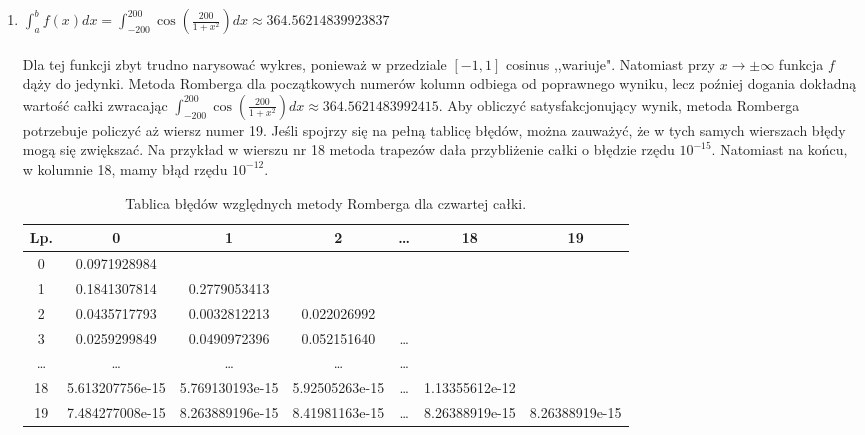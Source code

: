 \documentclass{article}
\begin{document}
\begin{enumerate}
	\item $\int_a^b f(x) dx = \int_{-200}^{200} \cos(\frac{200}{1 + x^2}) dx  \approx 364.56214839923837$ \\ \\
	Dla tej funkcji zbyt trudno narysować wykres, ponieważ w przedziale $[-1, 1]$ cosinus ,,wariuje".
	Natomiast przy $x \to \pm \infty$ funkcja $f$ dąży do jedynki.
	Metoda Romberga dla początkowych numerów kolumn odbiega od poprawnego wyniku,
	lecz poźniej dogania dokładną wartość całki zwracając $\int_{-200}^{200} \cos(\frac{200}{1 + x^2}) dx \approx 364.5621483992415$.
	\newline
	\newline
	Aby obliczyć satysfakcjonujący wynik, metoda Romberga potrzebuje policzyć aż wiersz numer 19.
	Jeśli spojrzy się na pełną tablicę błędów, można zauważyć, że w tych samych wierszach błędy mogą się
	zwiększać. Na przykład w wierszu nr 18 metoda trapezów dała przybliżenie całki o błędzie rzędu
	$10^{-15}$. Natomiast na końcu, w kolumnie 18, mamy błąd rzędu $10^{-12}$.

	\begin{table}[h]
	\centering
	\begin{tabular}[c]{|c|c|c|c|c|c|c|}
	\hline
	Lp. & 0 & 1 & 2 & \ldots & 18 & 19 \\
	\hline
	0 & 0.0971928984 &  &  &  &  & \\
	1 & 0.1841307814 & 0.2779053413 &  &  & & \\
	2 & 0.0435717793 & 0.0032812213 & 0.022026992 & & & \\
	3 & 0.0259299849 & 0.0490972396 & 0.052151640 & \dots &  &  \\
	\dots & \dots & \dots & \dots & \dots & & \\
	18 & 5.613207756e-15 & 5.769130193e-15 & 5.92505263e-15 & \dots & 1.13355612e-12	 &  \\
	19 & 7.484277008e-15 & 8.263889196e-15 & 8.41981163e-15 & \dots & 8.26388919e-15 & 8.26388919e-15\\
	\hline
	\end{tabular}
	\caption{Tablica błędów względnych metody Romberga dla czwartej całki.}
	\end{table}



\end{enumerate}
\end{document}
